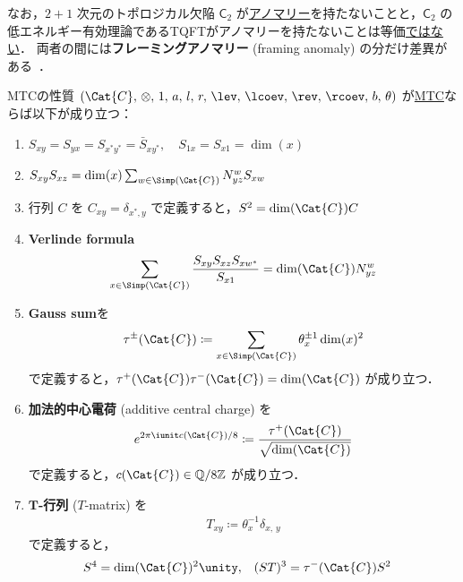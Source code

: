 \documentclass[TQFT_main]{subfiles}
\begin{document}
なお，$2+1$ 次元のトポロジカル欠陥 $\mathsf{C}_2$ が\hyperref[def:anomaly-QP]{アノマリー}を持たないことと，$\mathsf{C}_2$ の低エネルギー有効理論であるTQFTがアノマリーを持たないことは等価\underline{ではない}．
両者の間には\textbf{フレーミングアノマリー} (framing anomaly) の分だけ差異がある~\cite{turaev2010quantum}．

\begin{myprop}[label=prop:MTC]{MTCの性質}
    $(\Cat{C},\, \otimes,\, 1,\, a,\, l,\, r,\, \lev,\, \lcoev,\, \rev,\, \rcoev,\, b,\, \theta)$ が\hyperref[def:MTC]{MTC}ならば以下が成り立つ：
    \begin{enumerate}
        \item $S_{xy} = S_{yx} = S_{x^*y^*} = \bar{S}_{xy^*},\quad S_{1x} = S_{x1} = \dim (x)$
        \item $S_{xy} S_{xz} = \dim(x) \sum_{w \in \Simp(\Cat{C})} N^w_{yz} S_{xw}$
        \item 行列 $C$ を $C_{xy} = \delta_{x^*,y}$ で定義すると，$S^2 = \dim(\Cat{C}) C$
        \item \textbf{Verlinde formula}
        \begin{align}
            \sum_{x \in \Simp(\Cat{C})} \frac{S_{xy} S_{xz} S_{xw^*}}{S_{x1}} = \dim(\Cat{C}) N^w_{yz}
        \end{align}
        \item \textbf{Gauss sum}を
        \begin{align}
            \tau^{\pm} (\Cat{C}) \coloneqq \sum_{x \in \Simp(\Cat{C})} \theta_x^{\pm 1} \dim (x)^2
        \end{align}
        で定義すると，$\tau^+(\Cat{C}) \tau^-(\Cat{C}) = \dim (\Cat{C})$ が成り立つ．
        \item \textbf{加法的中心電荷} (additive central charge) を
        \begin{align}
            e^{2\pi \iunit c(\Cat{C})/8} \coloneqq \frac{\tau^+(\Cat{C})}{\sqrt{\dim (\Cat{C})}}
        \end{align}
        で定義すると，$c(\Cat{C}) \in \mathbb{Q} / 8 \mathbb{Z}$ が成り立つ．
        \item \textbf{$\bm{T}$-行列} ($T$-matrix) を
        \begin{align}
            T_{xy} \coloneqq \theta_x^{-1} \delta_{x,\, y}
        \end{align}
        で定義すると，
        \begin{align}
            S^4 &= \dim(\Cat{C})^2 \unity, & (ST)^3 &= \tau^-(\Cat{C}) S^2
        \end{align}

\end{enumerate}
\end{myprop}
\end{document}
